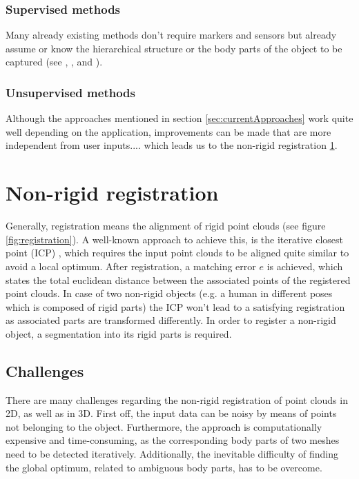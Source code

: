 \subsubsection{Supervised methods}
Many already existing methods don't require markers and sensors but already assume or know the hierarchical structure or the body parts of the object to be captured (see \cite{multiLayerSkeleton}, \cite{baker2005shape}, \cite{de2008hierarchical} and \cite{michoud2007real}).

\subsubsection{Unsupervised methods}
Although the approaches mentioned in section \ref{sec:currentApproaches} work quite well depending on the application, improvements can be made that are more independent from user inputs.... which leads us to the non-rigid registration \ref{nonrigidregistration}.

\section{Non-rigid registration}
\label{nonrigidregistration}

Generally, registration means the alignment of rigid point clouds (see figure \ref{fig:registration}). A well-known approach to achieve this, is the iterative closest point (ICP) \cite{ICP}, which requires the input point clouds to be aligned quite similar to avoid a local optimum. After registration, a matching error $e$ is achieved, which states the total euclidean distance between the associated points of the registered point clouds. In case of two non-rigid objects (e.g. a human in different poses which is composed of rigid parts) the ICP won't lead to a satisfying registration as associated parts are transformed differently. In order to register a non-rigid object, a segmentation into its rigid parts is required.

\subsection{Challenges}
\label{Challenges}
There are many challenges regarding the non-rigid registration of point clouds in 2D, as well as in 3D. First off, the input data can be noisy by means of points not belonging to the object. Furthermore, the approach is computationally expensive and time-consuming, as the corresponding body parts of two meshes need to be detected iteratively. Additionally, the inevitable difficulty of finding the global optimum, related to ambiguous body parts, has to be overcome.

